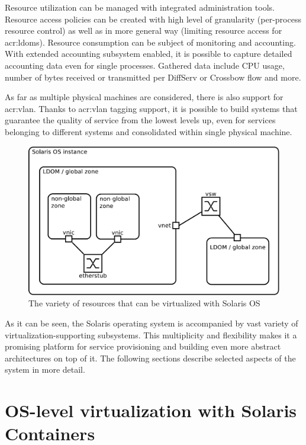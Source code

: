 \documentclass[11pt]{book}
\begin{document}
      Resource utilization can be managed with integrated administration tools. Resource access policies can be created
      with high level of granularity (per-process resource control) as well as in more general way (limiting resource
      access for \gls{acr:ldom}s). Resource consumption can be subject of monitoring and accounting. With extended
      accounting subsystem enabled, it is possible to capture detailed accounting data even for single processes.
      Gathered data include CPU usage, number of bytes received or transmitted per DiffServ or Crossbow flow and more.

      As far as multiple physical machines are considered, there is also support for \gls{acr:vlan}.  Thanks to
      \gls{acr:vlan} tagging support, it is possible to build systems that guarantee the quality of service from the
      lowest levels up, even for services belonging to different systems and consolidated within single physical
      machine.

      \begin{figure}[H]
        \begin{center}
          \includegraphics[width=.7\textwidth]{img/solaris/full-featured.pdf}
        \end{center}

        \caption{The variety of resources that can be virtualized with Solaris OS}
      \end{figure}

      As it can be seen, the Solaris operating system is accompanied by vast variety of virtualization-supporting
      subsystems. This multiplicity and flexibility makes it a promising platform for service provisioning and building
      even more abstract architectures on top of it. The following sections describe selected aspects of the system in
      more detail.


    \section{OS-level virtualization with Solaris Containers}
    \label{sec:sol:containers}
\end{document}
